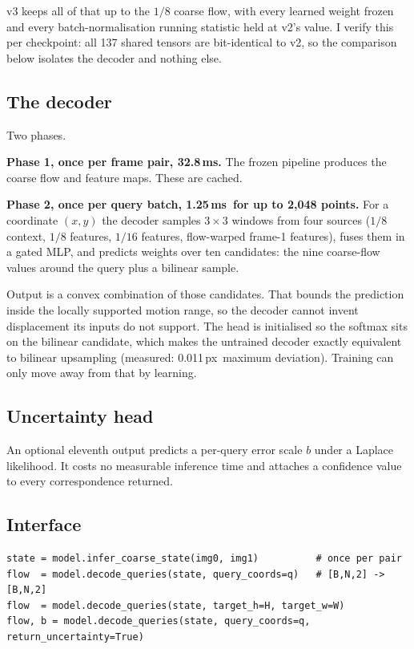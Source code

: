 \documentclass[11pt,a4paper]{article}
\newcommand{\px}{\,px}
\newcommand{\ms}{\,ms}
\begin{document}
v3 keeps all of that up to the $1/8$ coarse flow, with every learned weight
frozen and every batch-normalisation running statistic held at v2's value. I
verify this per checkpoint: all 137 shared tensors are bit-identical to v2, so the
comparison below isolates the decoder and nothing else.

\subsection{The decoder}
Two phases.

\textbf{Phase 1, once per frame pair, 32.8\ms.} The frozen pipeline produces the
coarse flow and feature maps. These are cached.

\textbf{Phase 2, once per query batch, 1.25\ms\ for up to 2{,}048 points.} For a
coordinate $(x, y)$ the decoder samples $3\times3$ windows from four sources
($1/8$ context, $1/8$ features, $1/16$ features, flow-warped frame-1 features),
fuses them in a gated MLP, and predicts weights over ten candidates: the nine
coarse-flow values around the query plus a bilinear sample.

Output is a convex combination of those candidates. That bounds the prediction
inside the locally supported motion range, so the decoder cannot invent
displacement its inputs do not support. The head is initialised so the softmax
sits on the bilinear candidate, which makes the untrained decoder exactly
equivalent to bilinear upsampling (measured: 0.011\px\ maximum deviation).
Training can only move away from that by learning.

\subsection{Uncertainty head}
An optional eleventh output predicts a per-query error scale $b$ under a Laplace
likelihood. It costs no measurable inference time and attaches a confidence value
to every correspondence returned.

\subsection{Interface}
\begin{small}
\begin{verbatim}
state = model.infer_coarse_state(img0, img1)          # once per pair
flow  = model.decode_queries(state, query_coords=q)   # [B,N,2] -> [B,N,2]
flow  = model.decode_queries(state, target_h=H, target_w=W)
flow, b = model.decode_queries(state, query_coords=q, return_uncertainty=True)
\end{verbatim}
\end{small}
\end{document}
